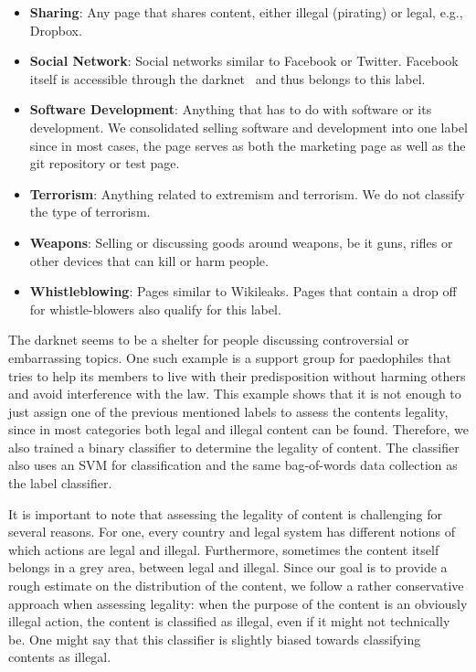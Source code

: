 \begin{itemize}
	\item \textbf{Sharing}: Any page that shares content, either illegal (pirating) or legal, e.g., Dropbox.
	\item \textbf{Social Network}: Social networks similar to Facebook or Twitter. Facebook itself is accessible through the darknet~\cite{facebook} and thus belongs to this label.
	\item \textbf{Software Development}: Anything that has to do with software or its development. We consolidated selling software and development into one label since in most cases, the page serves as both the marketing page as well as the git repository or test page.
	\item \textbf{Terrorism}: Anything related to extremism and terrorism. We do not classify the type of terrorism.
	\item \textbf{Weapons}: Selling or discussing goods around weapons, be it guns, rifles or other devices that can kill or harm people.
	\item \textbf{Whistleblowing}: Pages similar to Wikileaks. Pages that contain a drop off for whistle-blowers also qualify for this label.
\end{itemize}

The darknet seems to be a shelter for people discussing controversial or embarrassing topics. One such example is a support group for paedophiles that tries to help its members to live with their predisposition without harming others and avoid interference with the law. This example shows that it is not enough to just assign one of the previous mentioned labels to assess the contents legality, since in most categories both legal and illegal content can be found. Therefore, we also trained a binary classifier to determine the legality of content. The classifier also uses an SVM for classification and the same bag-of-words data collection as the label classifier.

It is important to note that assessing the legality of content is challenging for several reasons. For one, every country and legal system has different notions of which actions are legal and illegal.
Furthermore, sometimes the content itself belongs in a grey area, between legal and illegal. Since our goal is to provide a rough estimate on the distribution of the content, we follow a rather conservative approach when assessing legality: when the purpose of the content is an obviously illegal action, the content is classified as illegal, even if it might not technically be. One might say that this classifier is slightly biased towards classifying contents as illegal.
